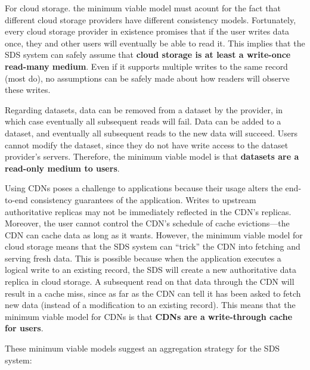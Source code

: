 For cloud storage. the minimum viable model must acount for the fact that
different cloud storage providers have different consistency models.
Fortunately, every cloud storage provider in existence promises that if the user
writes data once, they and other users will eventually be able to read it.
This implies that the SDS system can safely assume that \textbf{cloud storage is
at least a write-once read-many medium}.  Even if it supports multiple writes to the
same record (most do), no assumptions can be safely made about how readers will
observe these writes.

Regarding datasets, data can be removed from a dataset by the provider, in which
case eventually all subsequent reads will fail.  Data can be added to a dataset,
and eventually all subsequent reads to the new data will succeed.  Users cannot modify the
dataset, since they do not have write access to the dataset provider's servers.
Therefore, the minimum viable model is that \textbf{datasets are a
read-only medium to users}.

Using CDNs poses a challenge to applications because their usage alters the
end-to-end consistency guarantees of the application.  Writes to upstream
authoritative replicas may not be immediately reflected in the CDN's replicas.
Moreover, the user cannot control the CDN's schedule of cache evictions---the CDN can cache data as long
as it wants.  However, the minimum viable model for cloud storage means that the
SDS system can ``trick'' the CDN into fetching and serving fresh data.  This is
possible because when the application executes a logical write to an existing
record, the SDS will create a new authoritative data replica in cloud storage.  A subsequent read on
that data through the CDN will result in a cache miss, since as far as the CDN
can tell it has been asked to fetch new data (instead of a modification to an
existing record).  This means that the minimum viable model for CDNs is that
\textbf{CDNs are a write-through cache for users}.

These minimum viable models suggest an aggregation strategy for the SDS system:

